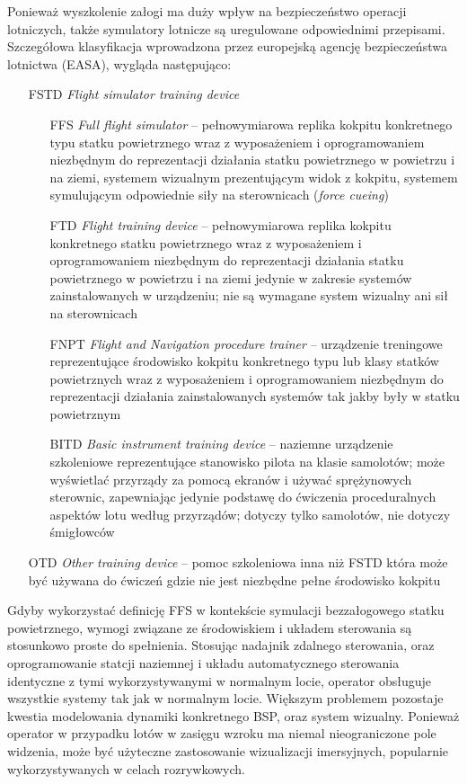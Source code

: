 Ponieważ wyszkolenie załogi ma duży wpływ na bezpieczeństwo operacji lotniczych, także symulatory lotnicze są uregulowane odpowiednimi przepisami. Szczegółowa klasyfikacja wprowadzona przez europejską agencję bezpieczeństwa lotnictwa (EASA), wygląda następująco\cite{cs-fstd}:
\begin{itemize}
  \item[FSTD] \emph{Flight simulator training device}
  \begin{itemize}
    \item[FFS] \emph{Full flight simulator} -- pełnowymiarowa replika kokpitu konkretnego typu statku powietrznego wraz z wyposażeniem i oprogramowaniem niezbędnym do reprezentacji działania statku powietrznego w powietrzu i na ziemi, systemem wizualnym prezentującym widok z kokpitu, systemem symulującym odpowiednie siły na sterownicach (\emph{force cueing})
    \item[FTD] \emph{Flight training device} -- pełnowymiarowa replika kokpitu konkretnego statku powietrznego wraz z wyposażeniem i oprogramowaniem niezbędnym do reprezentacji działania statku powietrznego w powietrzu i na ziemi jedynie w zakresie systemów zainstalowanych w urządzeniu; nie są wymagane system wizualny ani sił na sterownicach
    \item[FNPT] \emph{Flight and Navigation procedure trainer} -- urządzenie treningowe reprezentujące środowisko kokpitu konkretnego typu lub klasy statków powietrznych wraz z wyposażeniem i oprogramowaniem niezbędnym do reprezentacji działania zainstalowanych systemów tak jakby były w statku powietrznym
    \item[BITD] \emph{Basic instrument training device} -- naziemne urządzenie szkoleniowe reprezentujące stanowisko pilota na klasie samolotów; może wyświetlać przyrządy za pomocą ekranów i używać sprężynowych sterownic, zapewniając jedynie podstawę do ćwiczenia proceduralnych aspektów lotu według przyrządów; dotyczy tylko samolotów, nie dotyczy śmigłowców
  \end{itemize} 
  \item[OTD] \emph{Other training device} -- pomoc szkoleniowa inna niż FSTD która może być używana do ćwiczeń gdzie nie jest niezbędne pełne środowisko kokpitu
\end{itemize}

Gdyby wykorzystać definicję FFS w kontekście symulacji bezzałogowego statku powietrznego, wymogi związane ze środowiskiem i układem sterowania są stosunkowo proste do spełnienia. Stosując nadajnik zdalnego sterowania, oraz oprogramowanie statcji naziemnej i układu automatycznego sterowania identyczne z tymi wykorzystywanymi w normalnym locie, operator obsługuje wszystkie systemy tak jak w normalnym locie. Większym problemem pozostaje kwestia modelowania dynamiki konkretnego BSP, oraz system wizualny. Ponieważ operator w przypadku lotów w zasięgu wzroku ma niemal nieograniczone pole widzenia, może być użyteczne zastosowanie wizualizacji imersyjnych, popularnie wykorzystywanych w celach rozrywkowych.

